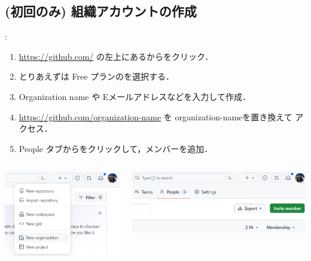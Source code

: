 \documentclass[aspectratio=169,dvipdfmx,cjk]{beamer}
\newcommand{\blue}[1]{ {\color{blue} #1} }
\begin{document}
\subsection{(初回のみ) 組織アカウントの作成}
\begin{frame}{\insertsection \thesubsection: \insertsubsection}
  \begin{enumerate}
    \item \href{https://github.com/}{https://github.com/} の左上にある\beamerbutton{+}からをクリック．
    \item とりあえずは Free プランのを選択する．
    \item Organization name や Eメールアドレスなどを入力して作成．
    \item \href{https://github.com/organization-name}{https://github.com/organization-name} を\blue{organization-nameを置き換えて}アクセス．
    \item People タブからをクリックして，メンバーを追加．
  \end{enumerate}
  \begin{columns}
    \begin{column}{0.3\textwidth}
        \includegraphics[width=1.0\linewidth]{fig/new-organization.png}
    \end{column}
    \begin{column}{0.6\textwidth}
      \includegraphics[width=1.0\linewidth]{fig/invite-member.png}
    \end{column}
  \end{columns}
\end{frame}
\end{document}
